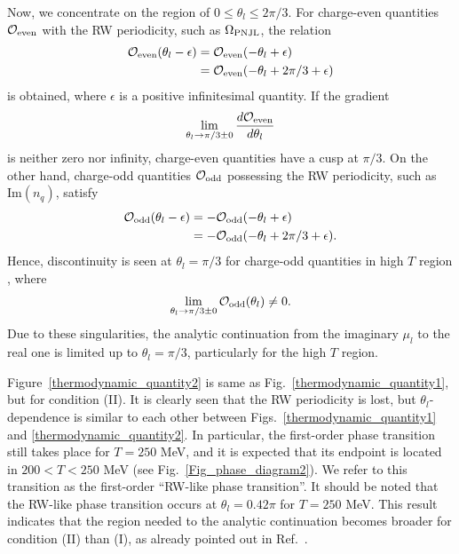 \documentclass[prd,superscriptaddress,unsortedaddress,
twocolumn,showpacs,preprintnumbers,amsmath,amssymb]{revtex4}
\begin{document}
    Now, we concentrate on the region of $0\le \theta_{l}\le 2\pi/3$.
    For charge-even quantities $\mathcal{O}_{\rm even}$ with the RW periodicity,
    such as $\Omega_{\rm PNJL}$,
    the relation
    \begin{align}
     \mathcal{O}_{\rm even}(\theta_{l}-\epsilon)
     &=\mathcal{O}_{\rm even}(-\theta_{l}+\epsilon)
     \notag \\
     &=\mathcal{O}_{\rm even}(-\theta_{l}+2\pi/3+\epsilon)
    \end{align}
    is obtained,
    where $\epsilon$ is a positive infinitesimal quantity.
    If the gradient
    \begin{eqnarray}
     \lim_{\theta_{l}\rightarrow \pi/3\pm 0}\frac{d\mathcal{O}_{\rm even}}{d\theta_{l}}
    \end{eqnarray}
    is neither zero nor infinity,
    charge-even quantities have a cusp at $\pi/3$.
    On the other hand, charge-odd quantities $\mathcal{O}_{\rm odd}$
    possessing the RW periodicity,
    such as $\textrm{Im} (n_{q})$,
    satisfy
    \begin{align}
     \mathcal{O}_{\rm odd}(\theta_{l}-\epsilon)&=
     -\mathcal{O}_{\rm odd}(-\theta_{l}+\epsilon)
     \notag \\
     &=-\mathcal{O}_{\rm odd}(-\theta_{l}+2\pi/3+\epsilon).
    \end{align}
    Hence, discontinuity is seen at $\theta_{l}=\pi/3$
    for charge-odd quantities in high $T$ region
    \cite{Sakai_PRD77_051901, Sakai_PRD78_036001,
    Sakai_PRD78_076007, Kouno_JPhys},
    where
    \begin{eqnarray}
     \lim_{\theta_{l}\rightarrow \pi/3\pm 0}\mathcal{O}_{\rm odd}(\theta_{l})\ne 0.
    \end{eqnarray}
    Due to these singularities, the analytic continuation
    from the imaginary $\mu_{l}$ to the real one
    is limited up to $\theta_{l}=\pi/3$,
    particularly for the high $T$ region.

    Figure~\ref{thermodynamic_quantity2}
    is same as Fig.~\ref{thermodynamic_quantity1},
    but for condition (II).
    It is clearly seen that the RW periodicity is lost,
    but $\theta_{l}$-dependence
    is similar to each other
    between Figs.~\ref{thermodynamic_quantity1} and
    \ref{thermodynamic_quantity2}.
    In particular, the first-order phase transition
    still takes place for $T=250$ MeV,
    and it is expected that its endpoint is located in $200<T<250$ MeV
    (see Fig.~\ref{Fig_phase_diagram2}).
    We refer to this transition as the first-order ``RW-like phase transition''.
    It should be noted that
    the RW-like phase transition occurs at $\theta_{l}=0.42\pi$
    for $T=250$ MeV.
    This result indicates that the
    region needed to the analytic continuation becomes broader
    for condition (II) than (I), as
    already pointed out in Ref.~\cite{Bonati}.
\end{document}
